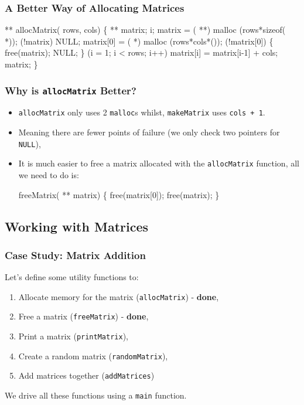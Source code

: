 \documentclass[smaller,handout,table]{beamer}
\begin{document}
\begin{frame}[fragile]
\frametitle{A Better Way of Allocating Matrices}
\begin{semiverbatim}
\scriptsize
\kr\kl{} ** allocMatrix( rows,  cols)
\kl\{
\kl   {} ** matrix;
\kl   {} i;
\kl
\kl   matrix = ( **) malloc (rows*sizeof( *));
\kl   {} (!matrix)  NULL; 
\kl
\kl   matrix[0] = ( *) malloc (rows*cols*());
\kl   {} (!matrix[0])
\kl   \{
\kl      free(matrix); 
\kl      {} NULL;  
\kl   \}
\kl
\kl   {} (i = 1; i < rows; i++)
\kl      matrix[i] = matrix[i-1] + cols;
\kl
\kl   {} matrix;
\kl\}
\end{semiverbatim}
\end{frame}

\begin{frame}[fragile]
\frametitle{Why is {\tt allocMatrix} Better?}
\begin{itemize}
\item {\tt allocMatrix} only uses 2 {\tt malloc}s whilst, {\tt makeMatrix} uses {\tt cols + 1}.
\item Meaning there are fewer points of failure (we only check two pointers for {\tt NULL}),
\item It is much easier to free a matrix allocated with the {\tt allocMatrix} function, all we need to do is:
\begin{semiverbatim}
 freeMatrix( ** matrix)
\{
   free(matrix[0]);
   free(matrix);
\}
\end{semiverbatim}
\end{itemize}
\end{frame}

\subsection{Working with Matrices}
\begin{frame}
\frametitle{Case Study: Matrix Addition}
Let's define some utility functions to:
\begin{enumerate}
\item Allocate memory for the matrix ({\tt allocMatrix}) - {\bf done},
\item Free a matrix ({\tt freeMatrix}) - {\bf done},
\item Print a matrix ({\tt printMatrix}),
\item Create a random matrix ({\tt randomMatrix}),
\item Add matrices together ({\tt addMatrices})
\end{enumerate}
We drive all these functions using a {\tt main} function.
\end{frame}
\end{document}
